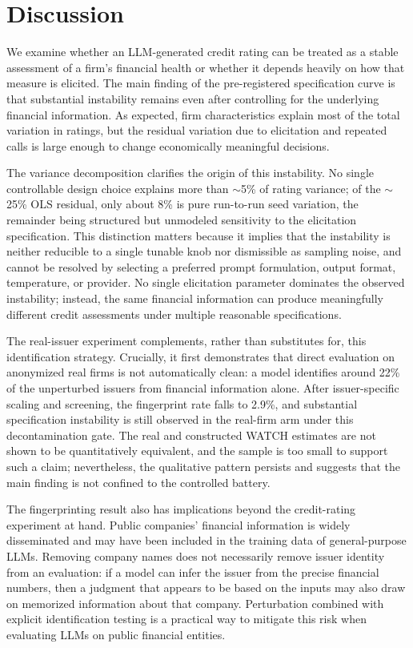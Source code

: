 \documentclass[pdflatex,sn-nature,lineno]{sn-jnl}
\theoremstyle{thmstyleone}
\begin{document}
\section{Discussion}
We examine whether an LLM-generated credit rating can be treated as a stable assessment of a firm's
financial health or whether it depends heavily on how that measure is elicited. The main finding of the
pre-registered specification curve is that substantial instability remains even after controlling for the
underlying financial information. As expected, firm characteristics explain most of the total variation
in ratings, but the residual variation due to elicitation and repeated calls is large enough to change
economically meaningful decisions.

The variance decomposition clarifies the origin of this instability. No single controllable design choice
explains more than $\sim$5\% of rating variance; of the $\sim$25\% OLS residual, only about 8\% is pure
run-to-run seed variation, the remainder being structured but unmodeled sensitivity to the elicitation
specification. This distinction matters because it implies that the instability is neither reducible to a
single tunable knob nor dismissible as sampling noise, and cannot be
resolved by selecting a preferred prompt formulation, output format, temperature, or provider. No single
elicitation parameter dominates the observed instability; instead, the same financial
information can produce meaningfully different credit assessments under multiple reasonable
specifications.

The real-issuer experiment complements, rather than substitutes for, this identification strategy.
Crucially, it first demonstrates that direct evaluation on anonymized real firms is not automatically
clean: a model identifies around 22\% of the unperturbed issuers from financial information alone. After
issuer-specific scaling and screening, the fingerprint rate falls to 2.9\%, and substantial
specification instability is still observed in the real-firm arm under this decontamination gate. The
real and constructed WATCH estimates are not shown to be quantitatively equivalent, and the sample is too
small to support such a claim; nevertheless, the qualitative pattern persists and suggests that the main
finding is not confined to the controlled battery.

The fingerprinting result also has implications beyond the credit-rating experiment at hand. Public
companies' financial information is widely disseminated and may have been included in the training data
of general-purpose LLMs. Removing company names does not necessarily remove issuer identity from an
evaluation: if a model can infer the issuer from the precise financial numbers, then a judgment that
appears to be based on the inputs may also draw on memorized information about that company. Perturbation
combined with explicit identification testing is a practical way to mitigate this risk when evaluating
LLMs on public financial entities.
\end{document}
